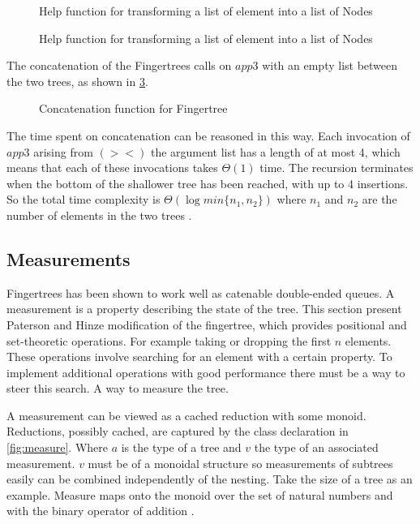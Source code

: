 \begin{figure}[h!]

\caption{Help function for transforming a list of element into a list of Nodes \label{fig:reduceAppend}}
\end{figure}


\begin{figure}[h!]

\caption{Help function for transforming a list of element into a list of Nodes \label{fig:nodesHelp}}
\end{figure}

The concatenation of the Fingertrees calls on $app3$ with an empty list
between the two trees, as shown in \cref{fig:concat}.

\begin{figure}[h!]

\caption{Concatenation function for Fingertree \label{fig:concat}}
\end{figure}

The time spent on concatenation can be reasoned in this way. Each invocation of
$app3$ arising from $(><)$ the argument list has a length of at most 4, which
means that each of these invocations takes $\Theta(1)$ time. The recursion
terminates when the bottom of the shallower tree has been reached, with up to
4 insertions. So the total time complexity is $\Theta(\log min\{n_1, n_2\})$
where $n_1$ and $n_2$ are the number of elements in the two trees
\cite{fingertree}.

\subsection{Measurements}
Fingertrees has been shown to work well as catenable double-ended queues. A 
measurement is a property describing the state of the tree. This section present
Paterson and Hinze modification of the fingertree, which provides positional and
set-theoretic operations. For example taking or dropping the first $n$ elements.
These operations involve searching for an element with a certain property.
To implement additional operations with good performance there must be a way
to steer this search. A way to measure the tree.

A measurement can be viewed as a cached reduction with some monoid. 
Reductions, possibly cached, are captured by the class declaration in 
\cref{fig:measure}. Where $a$ is the type of a tree and $v$ the type of an
associated measurement. $v$ must be of a monoidal structure so measurements of
subtrees easily can be combined independently of the nesting. Take the size of a
tree as an example. Measure maps onto the monoid over the set of natural numbers
and with the binary operator of addition \cite{fingertree}.

